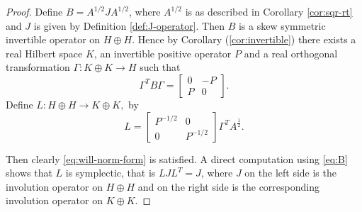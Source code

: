 \documentclass[12pt,a4paper,twoside]{article}
\numberwithin{equation}{section}
\theoremstyle{definition}  %
\theoremstyle{plain}  %
\theoremstyle{remark} %
\begin{document}
\begin{proof}
  Define $B= A^{1/2}JA^{1/2}$, where $A^{1/2}$ is as described in Corollary \ref{cor:sqr-rt} and $J$ is given by Definition \ref{def:J-operator}. Then $B$ is a skew symmetric invertible operator on $H\oplus H$.
 Hence by Corollary (\ref{cor:invertible})  there exists a real Hilbert space $K$, an invertible positive operator $P$ and  a real orthogonal transformation $\Gamma \colon K\oplus K \to H$ such that
\begin{equation} \label{eq:B}
   \Gamma^{T} B \Gamma =  \begin{bmatrix}
                          0 & -P   \\
                          P & 0
                         \end{bmatrix}.
  \end{equation}
Define $L \colon  H\oplus H \to K\oplus K ,$ by 
 \begin{equation}
   L      = \begin{bmatrix}
                          P^{-1/2}  & 0  \\
                           0 &  P^{-1/2}
                         \end{bmatrix} \Gamma ^TA^{\frac{1}{2}}.
  \end{equation}

Then clearly \ref{eq:will-norm-form} is satisfied.  A direct computation using \ref{eq:B} shows that $L$ is symplectic, that is $
LJL^T = J$, where $J$ on the left side  is the involution operator on $H\oplus H$ and on the right side is the corresponding involution operator on $K\oplus K.$  
%



\end{proof}
\end{document}

